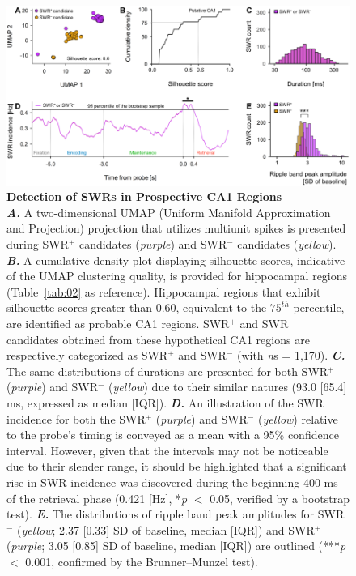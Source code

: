 \documentclass[final,3p,times,twocolumn]{elsarticle}
\begin{document}
        \begin{figure}[ht]
        	\centering
            \includegraphics[width=1\textwidth]{./src/figures/.png/Figure_ID_04.png}
        	\caption{\textbf{
Detection of SWRs in Prospective CA1 Regions
}
\smallskip
\\
\textbf{\textit{A.}} A two-dimensional UMAP (Uniform Manifold Approximation and Projection) \cite{mcinnes_umap_2018} projection that utilizes multiunit spikes is presented during SWR$^+$ candidates (\textit{purple}) and SWR$^-$ candidates (\textit{yellow}). \textbf{\textit{B.}} A cumulative density plot displaying silhouette scores, indicative of the UMAP clustering quality, is provided for hippocampal regions (Table~\ref{tab:02} as reference). Hippocampal regions that exhibit silhouette scores greater than 0.60, equivalent to the $75^{th}$ percentile, are identified as probable CA1 regions. SWR$^+$ and SWR$^-$ candidates obtained from these hypothetical CA1 regions are respectively categorized as SWR$^+$ and SWR$^-$ (with \textit{n}s = 1,170). \textbf{\textit{C.}} The same distributions of durations are presented for both SWR$^+$ (\textit{purple}) and SWR$^-$ (\textit{yellow}) due to their similar natures (93.0 [65.4] ms, expressed as median [IQR]). \textbf{\textit{D.}} An illustration of the SWR incidence for both the SWR$^+$ (\textit{purple}) and SWR$^-$ (\textit{yellow}) relative to the probe's timing is conveyed as a mean with a 95\% confidence interval. However, given that the intervals may not be noticeable due to their slender range, it should be highlighted that a significant rise in SWR incidence was discovered during the beginning 400 ms of the retrieval phase (0.421 [Hz], *\textit{p} $<$ 0.05, verified by a bootstrap test). \textbf{\textit{E.}} The distributions of ripple band peak amplitudes for SWR$^-$ (\textit{yellow}; 2.37 [0.33] SD of baseline, median [IQR]) and SWR$^+$ (\textit{purple}; 3.05 [0.85] SD of baseline, median [IQR]) are outlined (***\textit{p} $<$ 0.001, confirmed by the Brunner--Munzel test).
}
        	\label{fig:04}
        \end{figure}
\end{document}
